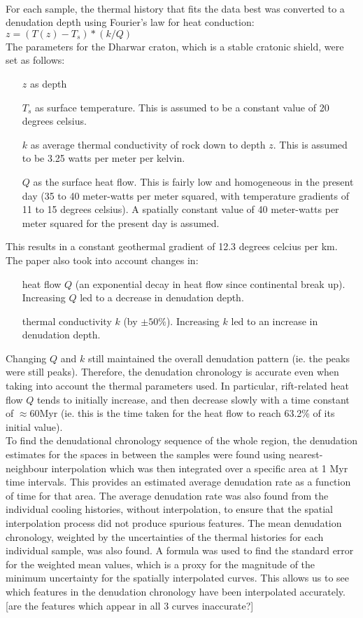\documentclass[11pt, oneside]{article}   	%
\begin{document}
\\For each sample, the thermal history that fits the data best was converted to a denudation depth using Fourier's law for heat conduction: $ z = (T(z) - T_{s})*(k/Q) $
\\The parameters for the Dharwar craton, which is a stable cratonic shield, were set as follows:
\begin{itemize}
        \item[$z$] as depth
        \item[$ T_{s}$] as surface temperature. This is assumed to be a constant value of 20 degrees celsius. 
        \item[$k$] as average thermal conductivity of rock down to depth $z$. This is assumed to be 3.25 watts per meter per kelvin.
        \item[$Q$] as the surface heat flow. This is fairly low and homogeneous in the present day (35 to 40 meter-watts per meter squared, with temperature gradients of 11 to 15 degrees celsius). A spatially constant value of 40 meter-watts per meter squared for the present day is assumed. 
\end{itemize}
This results in a constant geothermal gradient of 12.3 degrees celcius per km.
\\The paper also took into account changes in:
\begin{itemize}
        \item[heat flow $Q$] (an exponential decay in heat flow since continental break up). Increasing $Q$ led to a decrease in denudation depth.
        \item[thermal conductivity $k$] (by $\pm 50 \%$). Increasing $k$ led to an increase in denudation depth.
\end{itemize}
Changing $Q$ and $k$ still maintained the overall denudation pattern (ie. the peaks were still peaks). Therefore, the denudation chronology is accurate even when taking into account the thermal parameters used. In particular, rift-related heat flow $Q$ tends to initially increase, and then decrease slowly with a time constant of $\approx$60Myr (ie. this is the time taken for the heat flow to reach 63.2\% of its initial value). 
\\ To find the denudational chronology sequence of the whole region, the denudation estimates for the spaces in between the samples were found using nearest-neighbour interpolation which was then integrated over a specific area at 1 Myr time intervals. This provides an estimated average denudation rate as a function of time for that area. 
The average denudation rate was also found from the individual cooling histories, without interpolation, to ensure that the spatial interpolation process did not produce spurious features.
The mean denudation chronology, weighted by the uncertainties of the thermal histories for each individual sample, was also found. A formula was used to find the standard error for the weighted mean values, which is a proxy for the magnitude of the minimum uncertainty for the spatially interpolated curves. This allows us to see which features in the denudation chronology have been interpolated accurately. [are the features which appear in all 3 curves inaccurate?]
\end{document}
